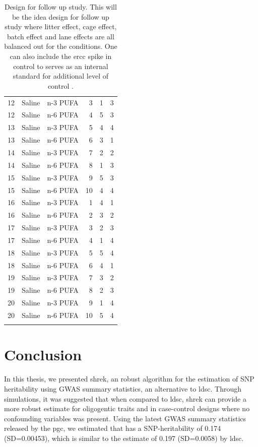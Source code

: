 \documentclass[12pt]{scrbook}
\newcommand*{\glng}{\glsentrylong}
\begin{document}
\begin{center}
\begin{longtable}[H]{rrrrrr}
		12    & Saline & n-3 PUFA & 3     & 1     & 3 \\
		12    & Saline & n-6 PUFA & 4     & 5     & 3 \\
		13    & Saline & n-3 PUFA & 5     & 4     & 4 \\
		13    & Saline & n-6 PUFA & 6     & 3     & 1 \\
		14    & Saline & n-3 PUFA & 7     & 2     & 2 \\
		14    & Saline & n-6 PUFA & 8     & 1     & 3 \\
		15    & Saline & n-3 PUFA & 9     & 5     & 3 \\
		15    & Saline & n-6 PUFA & 10    & 4     & 4 \\
		16    & Saline & n-3 PUFA & 1     & 4     & 1 \\
		16    & Saline & n-6 PUFA & 2     & 3     & 2 \\
		17    & Saline & n-3 PUFA & 3     & 2     & 3 \\
		17    & Saline & n-6 PUFA & 4     & 1     & 4 \\
		18    & Saline & n-3 PUFA & 5     & 5     & 4 \\
		18    & Saline & n-6 PUFA & 6     & 4     & 1 \\
		19    & Saline & n-3 PUFA & 7     & 3     & 2 \\
		19    & Saline & n-6 PUFA & 8     & 2     & 3 \\
		20    & Saline & n-3 PUFA & 9     & 1     & 4 \\
		20    & Saline & n-6 PUFA & 10    & 5     & 4 \\
		\bottomrule
		\caption[Design for Follow Up Study]{
			Design for follow up study.
			This will be the idea design for follow up study where litter effect, cage effect, batch effect and lane effects are all balanced out for the conditions.
			One can also include the \gls{ercc} spike in control to serves as an internal standard for additional level of control \citep{Jiang2011a}.
		}
		\label{tab:bestdesign}%
	\end{longtable}%
\end{center}
	\chapter{Conclusion}
	\label{conclusionChapter}
	\glsresetall
	In this thesis, we presented \gls{shrek}, an robust algorithm for the estimation of \gls{SNP} heritability using \gls{GWAS} summary statistics, an alternative to \gls{ldsc}.
	Through simulations, it was suggested that when compared to \gls{ldsc}, \gls{shrek} can provide a more robust estimate for oligogentic traits and in case-control designs where no confounding variables was present. 
	Using the latest \gls{GWAS} summary statistics released by the \gls{pgc}, we estimated that \glng{scz} has a \gls{SNP}-heritability of 0.174 (SD=0.00453), which is similar to the estimate of 0.197 (SD=0.0058) by \gls{ldsc}.
	
\end{document}
